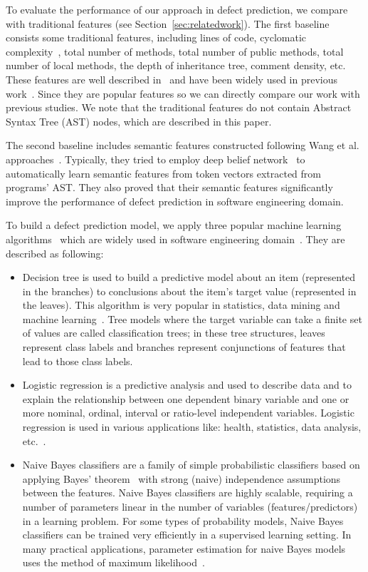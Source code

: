 To evaluate the performance of our approach in defect prediction, we compare with traditional features (see Section~\ref{sec:relatedwork}). The first baseline consists some traditional features, including lines of code, cyclomatic complexity~\cite{mccabe1976complexity}, total number of methods, total number of public methods, total number of local methods, the depth of inheritance tree, comment density, etc. These features are well described in~\cite{hassan2009predicting} and have been widely used in previous work~\cite{jing2014dictionary, menzies2007data, menzies2010defect, nam2013transfer, zimmermann2007predicting, yang2015deep}. Since they are popular features so we can directly compare our work with previous studies. We note that the traditional features do not contain Abstract Syntax Tree (AST) nodes, which are described in this paper. 

The second baseline includes semantic features constructed following Wang et al. approaches~\cite{wang2016automatically}. Typically, they tried to employ deep belief network~\cite{hinton2009deep} to automatically learn semantic features from token vectors extracted from programs' AST. They also proved that their semantic features significantly improve the performance of defect prediction in software engineering domain. 

To build a defect prediction model, we apply three popular machine learning algorithms~\cite{bishop2006pattern} which are widely used in software engineering domain~\cite{wang2016automatically, wang2013using, jing2014dictionary}. They are described as following: 
\begin{itemize}
	\item Decision tree is used to build a predictive model about an item (represented in the branches) to conclusions about the item's target value (represented in the leaves). This algorithm is very popular in statistics, data mining and machine learning~\cite{safavian1991survey}. Tree models where the target variable can take a finite set of values are called classification trees; in these tree structures, leaves represent class labels and branches represent conjunctions of features that lead to those class labels.
	\item Logistic regression is a predictive analysis and used to describe data and to explain the relationship between one dependent binary variable and one or more nominal, ordinal, interval or ratio-level independent variables. Logistic regression is used in various applications like: health, statistics, data analysis, etc.~\cite{hosmer2013applied}.
	\item Naive Bayes classifiers are a family of simple probabilistic classifiers based on applying Bayes' theorem~\cite{vapnik1998statistical} with strong (naive) independence assumptions between the features. Naive Bayes classifiers are highly scalable, requiring a number of parameters linear in the number of variables (features/predictors) in a learning problem. For some types of probability models, Naive Bayes classifiers can be trained very efficiently in a supervised learning setting. In many practical applications, parameter estimation for naive Bayes models uses the method of maximum likelihood~\cite{pan2002maximum}.
\end{itemize}

